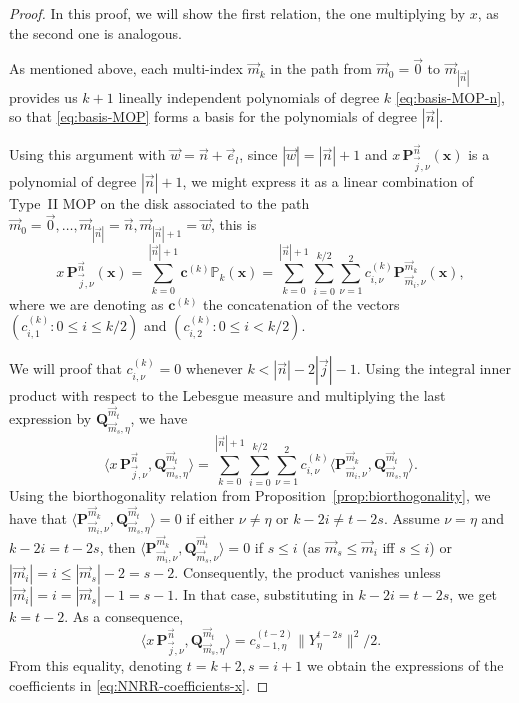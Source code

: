 \documentclass[10pt,a4paper]{amsart}
\begin{document}
    \begin{proof}
        In this proof, we will show the first relation, the one multiplying by $x$, as the second one is analogous.
    
        As mentioned above, each multi-index $\vec m_k$ in the path from $\vec m_0=\vec 0$ to $\vec m_{|\vec n|}$ provides us $k+1$ lineally independent polynomials of degree $k$ \eqref{eq:basis-MOP-n}, so that \eqref{eq:basis-MOP} forms a basis for the polynomials of degree $|\vec n|$.
        
        Using this argument with $\vec w=\vec n + \vec e_l$, since $|\vec w|=|\vec n|+1$ and $x \, \mathbf P_{\vec j,\nu}^{\vec n}(\mathbf x)$ is a polynomial of degree $|\vec n|+1$, we might express it as a linear combination of Type~II MOP on the disk associated to the path $\vec m_0=\vec 0,\dots,\vec m_{|\vec n|}=\vec n, \vec m_{|\vec n|+1}=\vec w$, this is
        $$
        x\, \mathbf P_{\vec j,\nu}^{\vec n}(\mathbf x) =  \sum_{k=0}^{|\vec n|+1}\mathbf c^{(k)} \mathbb P_k(\mathbf x) =  \sum_{k=0}^{|\vec n|+1}\sum_{i=0}^{k/2}\sum_{\nu=1}^2 c_{i,\nu}^{(k)} \mathbf P_{\vec m_i,\nu}^{\vec m_k}(\mathbf x),
        $$
        where we are denoting as $\mathbf c^{(k)}$ the concatenation of the vectors $(c_{i,1}^{(k)}:0\leq i\leq k/2 )$ and $(c_{i,2}^{(k)}:0\leq i< k/2 )$. 
        
        
        We will proof that $c^{(k)}_{i,\nu}=0$ whenever $k<|\vec n|-2|\vec j|-1$. Using the integral inner product with respect to the Lebesgue measure and multiplying the last expression by $\mathbf Q^{\vec m_t}_{\vec m_s,\eta}$, we have
        $$
        \langle x\, \mathbf P_{\vec j,\nu}^{\vec n}, \mathbf Q^{\vec m_t}_{\vec m_s,\eta}\rangle =  \sum_{k=0}^{|\vec n|+1}\sum_{i=0}^{k/2}\sum_{\nu=1}^2 c_{i,\nu}^{(k)} \langle  \mathbf P_{\vec m_i,\nu}^{\vec m_k},\mathbf Q^{\vec m_t}_{\vec m_s,\eta} \rangle.
        $$
        Using the biorthogonality relation from Proposition~\ref{prop:biorthogonality}, we have that $\langle  \mathbf P_{\vec m_i,\nu}^{\vec m_k},\mathbf Q^{\vec m_t}_{\vec m_s,\eta} \rangle=0$ if either $\nu\neq \eta$ or $k-2i \neq t-2 s$. Assume $\nu = \eta$ and $k-2i = t-2 s$, then $\langle \mathbf P_{\vec m_{i},\nu}^{\vec m_k}, \mathbf Q^{\vec m_t}_{\vec m_s,\nu} \rangle=0$ if $s\leq i$ (as $\vec m_s\leq\vec m_i$ iff $s\leq i$) or $|\vec m_i|=i\leq|\vec m_s|-2=s-2$. Consequently, the product vanishes unless $|\vec m_i|=i=|\vec m_s|-1=s-1$. In that case, substituting in $k-2i = t-2 s$, we get $k=t-2$. As a consequence, 
        $$
       \langle x\, \mathbf P_{\vec j,\nu}^{\vec n}, \mathbf Q^{\vec m_t}_{\vec m_s,\eta}\rangle= c^{(t-2)}_{s-1,\eta}\|Y_{\eta}^{t-2s}\|^2/2.
        $$
        From this equality, denoting $t=k+2, s=i+1$ we obtain the expressions of the coefficients in \eqref{eq:NNRR-coefficients-x}.
        

\end{proof}
\end{document}
